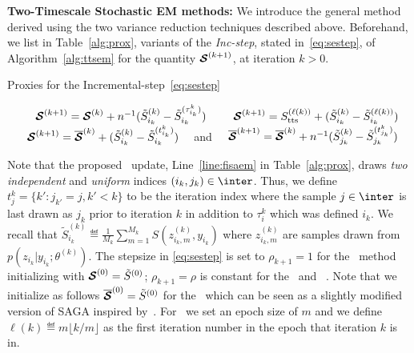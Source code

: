 \documentclass[12pt]{article}
\begin{document}
\medskip
\noindent \textbf{Two-Timescale Stochastic EM methods:}
We introduce the general method derived using the two variance reduction techniques described above.
Beforehand, we list in Table~\ref{alg:prox}, variants of the \textit{Inc-step}, stated in~\eqref{eq:sestep}, of Algorithm~\ref{alg:ttsem} for the quantity ${\bm{\mathcal{S}}}^{(k+1)}$, at iteration $k >0$.

 \begin{protocol}[H]
\caption{Proxies for the Incremental-step~\eqref{eq:sestep}}\label{alg:prox}
  \begin{algorithmic}[1]
  \STATE \textit{\ISAEM\ }$\hspace{0.7cm} {\bm{\mathcal{S}}}^{(k+1)} = {\bm{\mathcal{S}}}^{(k)} + n^{-1} ( \tilde{S}_{i_k}^{(k)}  - \tilde{S}_{i_k}^{(\tau_{i_k}^k)} ) \label{eq:isaem}$
    \STATE \textit{\SAEMVR\ }$\hspace{0.5cm} {\bm{\mathcal{S}}}^{(k+1)}  = S_{\textrm{tts}}^{(\ell(k))} +  ( \tilde{S}_{i_k}^{(k)}  -\tilde{S}_{i_k}^{(\ell(k))} ) \label{eq:vrsaem}$
      \STATE \textit{\FISAEM\ }$\hspace{0.6cm} {\bm{\mathcal{S}}}^{(k+1)} = \overline{{\bm{\mathcal{S}}}}^{(k)} + ( \tilde{S}_{i_k}^{(k)}  - \tilde{S}_{i_k}^{(t_{i_k}^k)} )\quad \label{eq:fisaem}$ and
             $ \quad \overline{{\bm{\mathcal{S}}}}^{(k+1)} = \overline{{\bm{\mathcal{S}}}}^{(k)} + n^{-1} ( \tilde{S}_{j_k}^{(k)}  - \tilde{S}_{j_k}^{(t_{j_k}^k)} )$ \label{line:fisaem}
  \end{algorithmic}
\end{protocol}

Note that the proposed \FISAEM\ update, Line~\ref{line:fisaem} in Table~\ref{alg:prox}, draws \emph{two} \emph{independent} and \emph{uniform} indices $(i_k, j_k) \in \inter$. 
Thus, we define $t_j^k = \{ k' : j_{k'} = j , k' < k \}$ to be the iteration index where the sample $j \in \inter$ is last drawn as $j_k$ prior to iteration $k$ in addition to $\tau_i^k$ which was defined \wrt $i_k$.
We recall that $\tilde{S}_{i_k}^{(k)} \eqdef  \frac{1}{M_k} \sum_{m=1}^{M_k} S(z_{i_k,m}^{(k)}, y_{i_k})$ where $z_{i_k,m}^{(k)}$ are samples drawn from $ p(z_{i_k}|y_{i_k};\theta^{(k)})$.
The stepsize in \eqref{eq:sestep} is set to $\rho_{k+1} = 1$ for the \ISAEM\ method initializing with ${\bm{\mathcal{S}}}^{(0)} = \tilde{S}^{(0)}$; $\rho_{k+1} = \rho$ is  constant for the \SAEMVR\ and \FISAEM\ . Note that we initialize as follows $\overline{{\bm{\mathcal{S}}}}^{(0)} = \tilde{S}^{(0)}$ for the \FISAEM\ which can be seen as a slightly modified version of SAGA inspired by~\citet{reddi2016fast}.
For \SAEMVR\, we set an epoch size of $m$ and we define $\ell(k) \eqdef m \lfloor k/m \rfloor$ as the first iteration number in the epoch that iteration $k$ is in.
\end{document}
